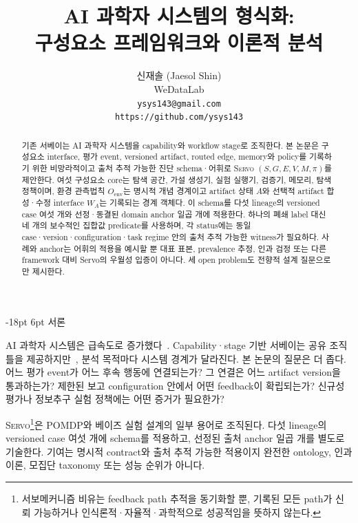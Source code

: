 \documentclass[11pt]{article}
\title{\textbf{AI 과학자 시스템의 형식화:\\
구성요소 프레임워크와 이론적 분석}}
\author{%
  신재솔 (Jaesol Shin) \\
  WeDataLab \\
  \texttt{ysys143@gmail.com} \\
  \texttt{https://github.com/ysys143}
}
\date{}
\makeatletter
\renewcommand\section{\@startsection{section}{1}{\z@}%
  {-18pt \@plus -4pt \@minus -2pt}%
  {6pt \@plus 2pt}%
  {\normalfont\large\bfseries}}
\newcommand{\sgmvpi}{$(S, G, E, V, M, \pi)$}
\newcommand{\framework}{\textsc{Servo}}
\makeatother
\begin{document}
\setlength{\emergencystretch}{2em}

\maketitle

\begin{abstract}
기존 서베이는 AI 과학자 시스템을 capability와 workflow stage로 조직한다. 본 논문은 구성요소 interface, 평가 event, versioned artifact, routed edge, memory와 policy를 기록하기 위한 비망라적이고 출처 추적 가능한 진단 schema·어휘로 \framework{} \sgmvpi{}를 제안한다. 여섯 구성요소 core는 탐색 공간, 가설 생성기, 실험 실행기, 검증기, 메모리, 탐색 정책이며, 환경 관측법칙 $O_{\mathrm{env}}$는 명시적 개념 경계이고 artifact 상태 $A$와 선택적 artifact 합성·수정 interface $W_A$는 기록되는 경계 객체다. 이 schema를 다섯 lineage의 versioned case 여섯 개와 선정·동결된 domain anchor 일곱 개에 적용한다. 하나의 폐쇄 label 대신 네 개의 보수적인 집합값 predicate를 사용하며, 각 status에는 동일 case·version·configuration·task regime 안의 출처 추적 가능한 witness가 필요하다. 사례와 anchor는 어휘의 적용을 예시할 뿐 대표 표본, prevalence 추정, 인과 검정 또는 다른 framework 대비 Servo의 우월성 입증이 아니다. 세 open problem도 전향적 설계 질문으로만 제시한다.
\end{abstract}

\section{서론}

AI 과학자 시스템은 급속도로 증가했다~\citep{boiko2023emergent,lu2024aiscientist,lu2026aiscientist,schmidgall2025agentlab,google2026aletheia,liu2026lasthuman}. Capability·stage 기반 서베이는 공유 조직틀을 제공하지만~\citep{wei2025agenticscience,tie2025survey}, 분석 목적마다 시스템 경계가 달라진다. 본 논문의 질문은 더 좁다. 어느 평가 event가 어느 후속 행동에 연결되는가? 그 연결은 어느 artifact version을 통과하는가? 제한된 보고 configuration 안에서 어떤 feedback이 확립되는가? 신규성 평가나 정보추구 실험 정책에는 어떤 증거가 필요한가?

\framework{}\footnote{서보메커니즘 비유는 feedback path 추적을 동기화할 뿐, 기록된 모든 path가 신뢰 가능하거나 인식론적·자율적·과학적으로 성공적임을 뜻하지 않는다.}은 POMDP와 베이즈 실험 설계의 일부 용어로 조직된다. 다섯 lineage의 versioned case 여섯 개에 schema를 적용하고, 선정된 출처 anchor 일곱 개를 별도로 기술한다. 기여는 명시적 contract와 출처 추적 가능한 적용이지 완전한 ontology, 인과이론, 모집단 taxonomy 또는 성능 순위가 아니다.
\end{document}
